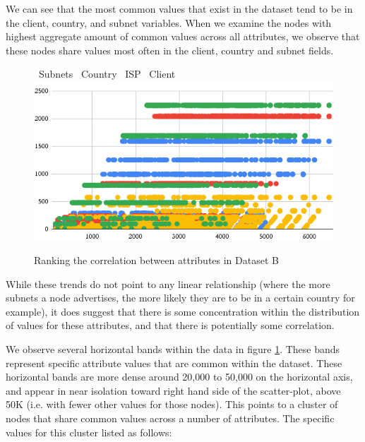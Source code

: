 \documentclass[conference]{IEEEtran}
\begin{document}
We can see that the most common values that exist in the dataset tend to be in the client, country, and subnet variables.  When we examine the nodes with highest aggregate amount of common values across all attributes, we observe that these nodes share values most often in the client, country and subnet fields.

\begin{figure}[htbp]
    \centering
    \LARGE \textcolor{bluebullet}\textbullet\ \normalsize Subnets %
    \LARGE \textcolor{redbullet}\textbullet\ \normalsize Country %
    \LARGE \textcolor{yellowbullet}\textbullet\ \normalsize ISP %
    \LARGE \textcolor{greenbullet}\textbullet\ \normalsize Client
    \includegraphics[width=1\linewidth]{figures/chart-7.png}
    \caption{Ranking the correlation between attributes in Dataset B}
    \label{fig:attribute-correlation-ranking-dataset-b}
\end{figure}

While these trends do not point to any linear relationship (where the more subnets a node advertises, the more likely they are to be in a certain country for example), it does suggest that there is some concentration within the distribution of values for these attributes, and that there is potentially some correlation.


We observe several horizontal bands within the data in figure \ref{fig:attribute-correlation-ranking-dataset-b}.  These bands represent specific attribute values that are common within the dataset.  These horizontal bands are more dense around 20,000 to 50,000 on the horizontal axis, and appear in near isolation toward right hand side of the scatter-plot, above 50K (i.e. with fewer other values for those nodes).  This points to a cluster of nodes that share common values across a number of attributes.  The specific values for this cluster listed as follows:
\end{document}
